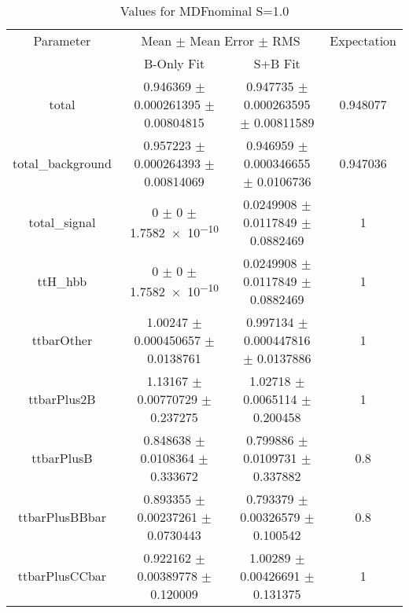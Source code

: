 \begin{table}
\centering
\caption{Values for MDFnominal S=1.0}
\begin{tabular}{cccc}
\toprule
Parameter & \multicolumn{2}{c}{Mean $\pm$ Mean Error $\pm$ RMS} & Expectation\\
 & B-Only Fit & S+B Fit & \\
\midrule
total & \num{0.946369} $\pm$ \num{0.000261395} $\pm$ \num{0.00804815} & \num{0.947735} $\pm$ \num{0.000263595} $\pm$ \num{0.00811589} & \num{0.948077}\\
total\_background & \num{0.957223} $\pm$ \num{0.000264393} $\pm$ \num{0.00814069} & \num{0.946959} $\pm$ \num{0.000346655} $\pm$ \num{0.0106736} & \num{0.947036}\\
total\_signal & \num{0} $\pm$ \num{0} $\pm$ \num{1.7582e-10} & \num{0.0249908} $\pm$ \num{0.0117849} $\pm$ \num{0.0882469} & \num{1}\\
ttH\_hbb & \num{0} $\pm$ \num{0} $\pm$ \num{1.7582e-10} & \num{0.0249908} $\pm$ \num{0.0117849} $\pm$ \num{0.0882469} & \num{1}\\
ttbarOther & \num{1.00247} $\pm$ \num{0.000450657} $\pm$ \num{0.0138761} & \num{0.997134} $\pm$ \num{0.000447816} $\pm$ \num{0.0137886} & \num{1}\\
ttbarPlus2B & \num{1.13167} $\pm$ \num{0.00770729} $\pm$ \num{0.237275} & \num{1.02718} $\pm$ \num{0.0065114} $\pm$ \num{0.200458} & \num{1}\\
ttbarPlusB & \num{0.848638} $\pm$ \num{0.0108364} $\pm$ \num{0.333672} & \num{0.799886} $\pm$ \num{0.0109731} $\pm$ \num{0.337882} & \num{0.8}\\
ttbarPlusBBbar & \num{0.893355} $\pm$ \num{0.00237261} $\pm$ \num{0.0730443} & \num{0.793379} $\pm$ \num{0.00326579} $\pm$ \num{0.100542} & \num{0.8}\\
ttbarPlusCCbar & \num{0.922162} $\pm$ \num{0.00389778} $\pm$ \num{0.120009} & \num{1.00289} $\pm$ \num{0.00426691} $\pm$ \num{0.131375} & \num{1}\\
\bottomrule
\end{tabular}
\end{table}